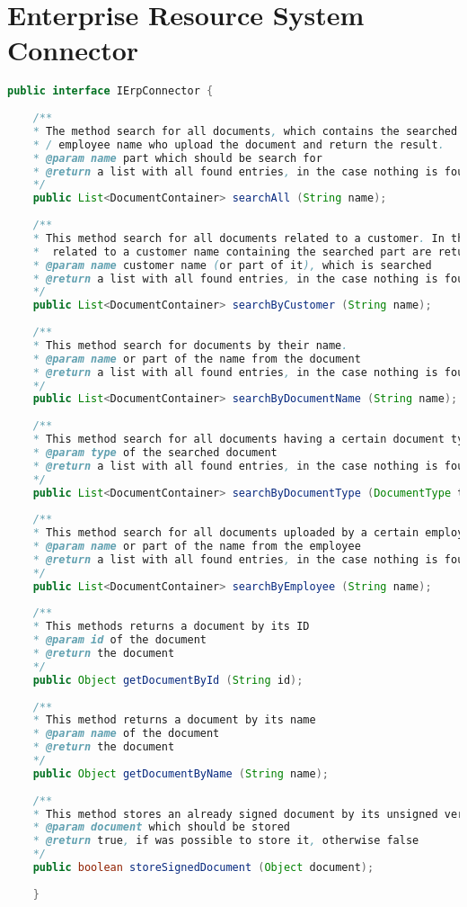 \section{Enterprise Resource System Connector}
\begin{lstlisting}[language=Java]
	public interface IErpConnector {
	
	/**
	* The method search for all documents, which contains the searched text part in the name / associated customer name
	* / employee name who upload the document and return the result.
	* @param name part which should be search for
	* @return a list with all found entries, in the case nothing is found an empty list will be returned
	*/
	public List<DocumentContainer> searchAll (String name);
	
	/**
	* This method search for all documents related to a customer. In the case not the full name is entered, all documents
	*  related to a customer name containing the searched part are returned.
	* @param name customer name (or part of it), which is searched
	* @return a list with all found entries, in the case nothing is found an empty list will be returned
	*/
	public List<DocumentContainer> searchByCustomer (String name);
	
	/**
	* This method search for documents by their name.
	* @param name or part of the name from the document
	* @return a list with all found entries, in the case nothing is found an empty list will be returned
	*/
	public List<DocumentContainer> searchByDocumentName (String name);
	
	/**
	* This method search for all documents having a certain document type.
	* @param type of the searched document
	* @return a list with all found entries, in the case nothing is found an empty list will be returned
	*/
	public List<DocumentContainer> searchByDocumentType (DocumentType type);
	
	/**
	* This method search for all documents uploaded by a certain employee.
	* @param name or part of the name from the employee
	* @return a list with all found entries, in the case nothing is found an empty list will be returned
	*/
	public List<DocumentContainer> searchByEmployee (String name);
	
	/**
	* This methods returns a document by its ID
	* @param id of the document
	* @return the document
	*/
	public Object getDocumentById (String id);
	
	/**
	* This method returns a document by its name
	* @param name of the document
	* @return the document
	*/
	public Object getDocumentByName (String name);
	
	/**
	* This method stores an already signed document by its unsigned version
	* @param document which should be stored
	* @return true, if was possible to store it, otherwise false
	*/
	public boolean storeSignedDocument (Object document);
	
	}
\end{lstlisting}

